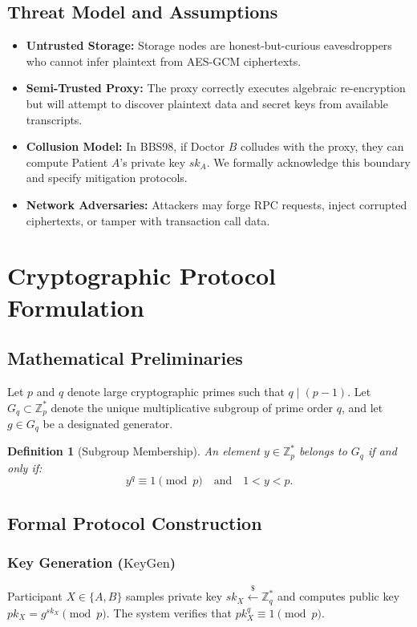 \documentclass[journal,10pt,twocolumn]{IEEEtran}
\newtheorem{definition}{Definition}
\begin{document}
\subsection{Threat Model and Assumptions}
\begin{itemize}
    \item \textbf{Untrusted Storage:} Storage nodes are honest-but-curious eavesdroppers who cannot infer plaintext from AES-GCM ciphertexts.
    \item \textbf{Semi-Trusted Proxy:} The proxy correctly executes algebraic re-encryption but will attempt to discover plaintext data and secret keys from available transcripts.
    \item \textbf{Collusion Model:} In BBS98, if Doctor $B$ colludes with the proxy, they can compute Patient $A$'s private key $sk_A$. We formally acknowledge this boundary and specify mitigation protocols.
    \item \textbf{Network Adversaries:} Attackers may forge RPC requests, inject corrupted ciphertexts, or tamper with transaction call data.
\end{itemize}

\section{Cryptographic Protocol Formulation}

\subsection{Mathematical Preliminaries}
Let $p$ and $q$ denote large cryptographic primes such that $q \mid (p - 1)$. Let $G_q \subset \mathbb{Z}_p^*$ denote the unique multiplicative subgroup of prime order $q$, and let $g \in G_q$ be a designated generator.

\begin{definition}[Subgroup Membership]
An element $y \in \mathbb{Z}_p^*$ belongs to $G_q$ if and only if:
\begin{equation}
y^q \equiv 1 \pmod p \quad \text{and} \quad 1 < y < p.
\end{equation}
\end{definition}

\subsection{Formal Protocol Construction}

\subsubsection{Key Generation ($\mathrm{KeyGen}$)}
Participant $X \in \{A, B\}$ samples private key $sk_X \xleftarrow{\$} \mathbb{Z}_q^*$ and computes public key $pk_X = g^{sk_X} \pmod p$. The system verifies that $pk_X^q \equiv 1 \pmod p$.
\end{document}
